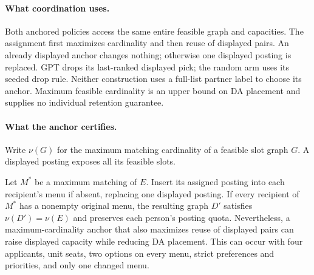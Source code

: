 \paragraph{What coordination uses.}
Both anchored policies access the same entire feasible graph and capacities.
The assignment first maximizes cardinality and then reuse of displayed pairs.
An already displayed anchor changes nothing; otherwise one displayed posting
is replaced. GPT drops its last-ranked displayed pick; the random arm uses
its seeded drop rule. Neither construction uses a full-list partner label
to choose its anchor. Maximum feasible cardinality is an upper bound on DA
placement and supplies no individual retention guarantee.

\paragraph{What the anchor certifies.}
Write $\nu(G)$ for the maximum matching cardinality of a feasible slot graph
$G$. A displayed posting exposes all its feasible slots.
\begin{proposition}\label{prop:anchor-capacity}
Let $M^*$ be a maximum matching of $E$. Insert its assigned posting into each
recipient's menu if absent, replacing one displayed posting. If every
recipient of $M^*$ has a nonempty original menu, the resulting graph $D'$
satisfies $\nu(D')=\nu(E)$ and preserves each person's posting quota.
Nevertheless, a maximum-cardinality anchor that also maximizes reuse of
displayed pairs can raise displayed capacity while reducing DA placement.
This can occur with four applicants, unit seats, two options on every menu,
strict preferences and priorities, and only one changed menu.
\end{proposition}
